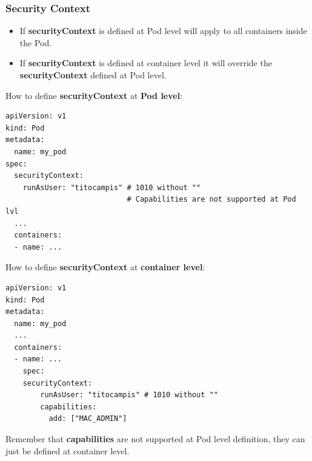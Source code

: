\documentclass{article}
\newenvironment{blocktemplateIII}[1]{%
    \tcolorbox[beamer,%
    noparskip,breakable,
    ,colframe=Red,%
    colbacklower=LimeGreen!75!LightGreen,%
    title=#1]}%
    {\endtcolorbox}
\newenvironment{codetemplate}[1][]{%
  \mybasecolorbox[#1]
  \itshape
}{%
  \endmybasecolorbox
}
\begin{document}
\subsubsection{Security Context}
\begin{itemize}
    \item If \textbf{securityContext} is defined at Pod level will apply to all containers inside the Pod.
    \item If \textbf{securityContext} is defined at container level it will override the \textbf{securityContext} defined at Pod level.
\end{itemize}

How to define \textbf{securityContext} at \textbf{Pod level}:
\begin{codetemplate}{}
\begin{verbatim}
apiVersion: v1
kind: Pod
metadata:
  name: my_pod
spec:
  securityContext:
    runAsUser: "titocampis" # 1010 without ""
                            # Capabilities are not supported at Pod lvl
  ...
  containers:
  - name: ...
\end{verbatim}
\end{codetemplate}

How to define \textbf{securityContext} at \textbf{container level}:
\begin{codetemplate}{}
\begin{verbatim}
apiVersion: v1
kind: Pod
metadata:
  name: my_pod
  ...
  containers:
  - name: ...
    spec:
    securityContext:
        runAsUser: "titocampis" # 1010 without ""
        capabilities:
          add: ["MAC_ADMIN"]
\end{verbatim}
\end{codetemplate}

\begin{blocktemplateIII}{WARNING}
Remember that \textbf{capabilities} are not supported at Pod level definition, they can just be defined at container level.
\end{blocktemplateIII}
\end{document}
